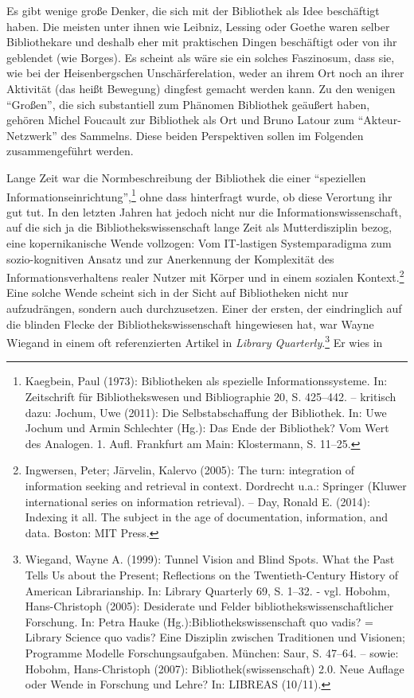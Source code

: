 Es gibt wenige große Denker, die sich mit der Bibliothek als Idee
beschäftigt haben. Die meisten unter ihnen wie Leibniz, Lessing oder
Goethe waren selber Bibliothekare und deshalb eher mit praktischen
Dingen beschäftigt oder von ihr geblendet (wie Borges). Es scheint als
wäre sie ein solches Faszinosum, dass sie, wie bei der Heisenbergschen
Unschärferelation, weder an ihrem Ort noch an ihrer Aktivität (das heißt
Bewegung) dingfest gemacht werden kann. Zu den wenigen \enquote{Großen},
die sich substantiell zum Phänomen Bibliothek geäußert haben, gehören
Michel Foucault zur Bibliothek als Ort und Bruno Latour zum
\enquote{Akteur-Netzwerk} des Sammelns. Diese beiden Perspektiven sollen
im Folgenden zusammengeführt werden.

Lange Zeit war die Normbeschreibung der Bibliothek die einer
\enquote{speziellen Informationseinrichtung},\footnote{Kaegbein, Paul
  (1973): Bibliotheken als spezielle Informationssysteme. In:
  Zeitschrift für Bibliothekswesen und Bibliographie 20, S. 425--442. --
  kritisch dazu: Jochum, Uwe (2011): Die Selbstabschaffung der
  Bibliothek. In: Uwe Jochum und Armin Schlechter (Hg.): Das Ende der
  Bibliothek? Vom Wert des Analogen. 1. Aufl. Frankfurt am Main:
  Klostermann, S. 11--25.} ohne dass hinterfragt wurde, ob diese
Verortung ihr gut tut. In den letzten Jahren hat jedoch nicht nur die
Informationswissenschaft, auf die sich ja die Bibliothekswissenschaft
lange Zeit als Mutterdisziplin bezog, eine kopernikanische Wende
vollzogen: Vom IT-lastigen Systemparadigma zum sozio-kognitiven Ansatz
und zur Anerkennung der Komplexität des Informationsverhaltens realer
Nutzer mit Körper und in einem sozialen Kontext.\footnote{Ingwersen,
  Peter; Järvelin, Kalervo (2005): The turn: integration of information
  seeking and retrieval in context. Dordrecht u.a.: Springer (Kluwer
  international series on information retrieval). -- Day, Ronald E.
  (2014): Indexing it all. The subject in the age of documentation,
  information, and data. Boston: MIT Press.} Eine solche Wende scheint
sich in der Sicht auf Bibliotheken nicht nur aufzudrängen, sondern auch
durchzusetzen. Einer der ersten, der eindringlich auf die blinden Flecke
der Bibliothekswissenschaft hingewiesen hat, war Wayne Wiegand in einem
oft referenzierten Artikel in \emph{Library Quarterly}.\footnote{Wiegand,
  Wayne A. (1999): Tunnel Vision and Blind Spots. What the Past Tells Us
  about the Present; Reflections on the Twentieth-Century History of
  American Librarianship. In: Library Quarterly 69, S. 1--32. - vgl.
  Hobohm, Hans-Christoph (2005): Desiderate und Felder
  bibliothekswissenschaftlicher Forschung. In: Petra Hauke
  (Hg.):Bibliothekswissenschaft quo vadis? = Library Science quo vadis?
  Eine Disziplin zwischen Traditionen und Visionen; Programme Modelle
  Forschungsaufgaben. München: Saur, S. 47--64. -- sowie: Hobohm,
  Hans-Christoph (2007): Bibliothek(swissenschaft) 2.0. Neue Auflage
  oder Wende in Forschung und Lehre? In: LIBREAS (10/11).} Er wies in
